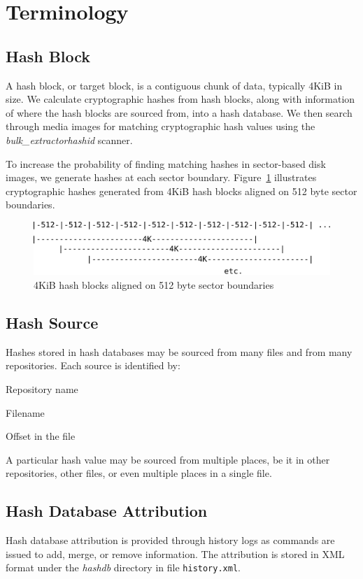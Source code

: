 \documentclass[11pt,twoside]{article}
\newcommand \bulk {\textit{bulk\_extractor}\xspace}
\newcommand \hdb {\textit{hashdb}\xspace}
\newcommand \hid {\textit{hashid}\xspace}
\begin{document}
\section{Terminology}

\subsection{Hash Block}
A hash block, or target block, is a contiguous chunk of data,
typically 4KiB in size.
We calculate cryptographic hashes from hash blocks,
along with information of where the hash blocks
are sourced from, into a hash database.
We then search through media images for matching cryptographic hash values
using the \bulk \hid scanner.

To increase the probability of finding matching hashes in sector-based
disk images, we generate hashes at each sector boundary.
Figure~\ref{fig:sector_boundaries} illustrates cryptographic hashes generated
from 4KiB hash blocks aligned on 512 byte sector boundaries.
\begin{figure}[h]
	\center
	\includegraphics[scale=1.0]{drawings/sector_boundaries.pdf}
	\caption{4KiB hash blocks aligned on 512 byte sector boundaries}
	\label{fig:sector_boundaries}
\end{figure}

\subsection{Hash Source}
Hashes stored in hash databases may be sourced from many files
and from many repositories.
Each source is identified by:
\begin{compactitem}
	\item Repository name
	\item Filename
	\item Offset in the file
\end{compactitem}

A particular hash value may be sourced from multiple places,
be it in other repositories, other files,
or even multiple places in a single file.

\subsection{Hash Database Attribution}
Hash database attribution is provided through history logs
as commands are issued to add, merge, or remove information.
The attribution is stored in XML format under the \hdb directory
in file \texttt{history.xml}.
\end{document}
